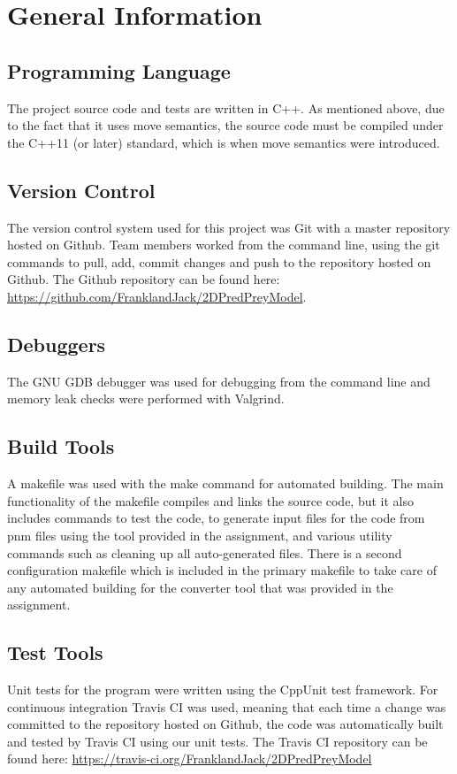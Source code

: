 \section{General Information}
\label{sec:examples}

\subsection{Programming Language}
The project source code and tests are written in C++. As mentioned above, due to the fact that it uses move semantics, the source code must be compiled under the C++11 (or later) standard, which is when move semantics were introduced. 

\subsection{Version Control}
The version control system used for this project was Git with a master repository hosted on Github. Team members worked from the command line, using the git commands to pull, add, commit changes and push to the repository hosted on Github. The Github repository can be found here: \url{https://github.com/FranklandJack/2DPredPreyModel}.

\subsection{Debuggers}
The GNU GDB debugger was used for debugging from the command line and memory leak checks were performed with Valgrind. 

\subsection{Build Tools}
A makefile was used with the make command for automated building. The main functionality of the makefile compiles and links the source code, but it also includes commands to test the code, to generate input files for the code from pnm files using the tool provided in the assignment, and various utility commands such as cleaning up all auto-generated files. There is a second configuration makefile which is included in the primary makefile to take care of any automated building for the converter tool that was provided in the assignment.
\subsection{Test Tools}
Unit tests for the program were written using the CppUnit test framework. For continuous integration Travis CI was used, meaning that each time a change was committed to the repository hosted on Github, the code was automatically built and tested by Travis CI using our unit tests. The Travis CI repository can be found here: \url{https://travis-ci.org/FranklandJack/2DPredPreyModel} 
